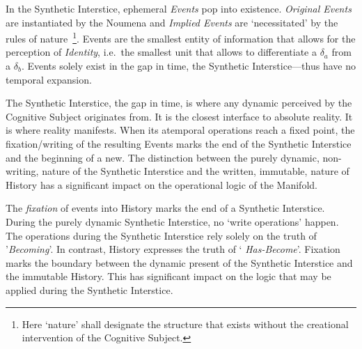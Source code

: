 
In the Synthetic Interstice, ephemeral {\it Events\/} pop into existence. {\it
Original Events\/} are instantiated by the Noumena and {\it Implied Events\/} are
`necessitated' by the rules of nature~\footnote{Here `nature' shall designate the
structure that exists without the creational intervention of the Cognitive
Subject.}. Events are the smallest entity of information that allows for the
perception of {\it Identity}, i.e.\ the smallest unit that allows to
differentiate a $\delta_a$ from a $\delta_b$. Events solely exist in the gap in time, the
Synthetic Interstice---thus have no temporal expansion. 

The Synthetic Interstice, the gap in time, is where any dynamic perceived by
the Cognitive Subject originates from. It is the closest interface to absolute
reality. It is where reality manifests. When its atemporal operations reach a
fixed point, the fixation/writing of the resulting Events marks the end of the
Synthetic Interstice and the beginning of a new. The distinction between the
purely dynamic, non-writing, nature of the Synthetic Interstice and the
written, immutable, nature of History has a significant impact on the
operational logic of the Manifold.

The {\it fixation\/} of events into History marks the end of a Synthetic
Interstice. During the purely dynamic Synthetic Interstice, no `write operations'
happen. The operations during the Synthetic Interstice rely solely on the 
truth of '{\it Becoming\/}'. In contrast, History expresses the truth of `{\it
Has-Become\/}'. Fixation marks the boundary between the dynamic present of
the Synthetic Interstice and the immutable History. This has significant impact
on the logic that may be applied during the Synthetic Interstice.
